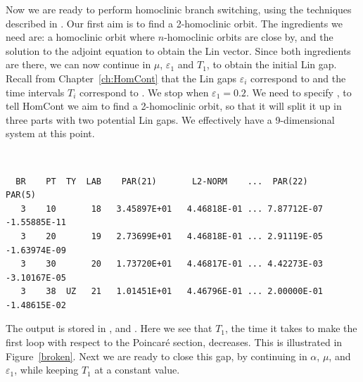 \documentclass[12pt]{report}
\begin{document}
Now we are ready to perform homoclinic branch switching, using
the techniques described in \cite{OlChKr:03}. 
Our first aim is to find a 2-homoclinic orbit. The
ingredients we need are: a homoclinic orbit where $n$-homoclinic orbits
are close by, and the solution to the adjoint equation to
obtain the Lin vector. Since both ingredients are there, we can now
continue in $\mu$, $\varepsilon_1$ and $T_1$, to obtain the initial
Lin gap. Recall from Chapter~\ref{ch:HomCont} that the Lin gaps 
$\varepsilon_i$ correspond to
 and the time intervals $T_i$ 
correspond to . We stop when
$\varepsilon_1=0.2$. We need to specify , to tell 
{\cal HomCont} we
aim to find a 2-homoclinic orbit, so that it will split it up in three
parts with two potential Lin gaps. We effectively have a 9-dimensional
system at this point.
\begin{center}
\\
\end{center} 
\begin{verbatim}
  BR    PT  TY  LAB    PAR(21)       L2-NORM    ...  PAR(22)       PAR(5)     
   3    10       18   3.45897E+01   4.46818E-01 ... 7.87712E-07  -1.55885E-11
   3    20       19   2.73699E+01   4.46818E-01 ... 2.91119E-05  -1.63974E-09
   3    30       20   1.73720E+01   4.46817E-01 ... 4.42273E-03  -3.10167E-05
   3    38  UZ   21   1.01451E+01   4.46796E-01 ... 2.00000E-01  -1.48615E-02
\end{verbatim}
The output is stored in ,   and .
Here we see that $T_1$, the time it takes to make the first loop with
respect to the Poincar\'e section, decreases. This is illustrated in
Figure~\ref{broken}. Next we are ready to close this gap, by continuing
in $\alpha$, $\mu$, and $\varepsilon_1$, while keeping $T_1$ at a
constant value.
\end{document}
